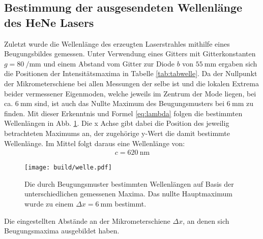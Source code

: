 \subsection{Bestimmung der ausgesendeten Wellenlänge des HeNe Lasers}
Zuletzt wurde die Wellenlänge des erzeugten Laserstrahles mithilfe eines Beugungsbildes gemessen. Unter Verwendung eines Gitters mit Gitterkonstanten $g = \SI{80}{\per\milli\meter}$ und einem Abstand vom Gitter zur Diode $b$ von $\SI{55}{\milli\meter}$ ergaben sich die Positionen der Intensitätsmaxima in Tabelle \ref{tab:tabwelle}. Da der Nullpunkt der Mikrometerschiene bei allen Messungen der selbe ist und die lokalen Extrema beider vermessener Eigenmoden, welche jeweils im Zentrum der Mode liegen, bei ca. $\SI{6}{\milli\meter}$ sind, ist auch das Nullte Maximum des Beugungsmusters bei $\SI{6}{\milli\meter}$ zu finden. Mit dieser Erkenntnis und Formel \eqref{eq:lambda} folgen die bestimmten Wellenlängen in Abb. \ref{fig:welle}. Die x Achse gibt dabei die Position des jeweilig betrachteten Maximums an, der zugehörige y-Wert die damit bestimmte Wellenlänge. Im Mittel folgt daraus eine Wellenlänge von: 
\begin{gather*}
	c = \SI{620}{\nano\meter}
	\end{gather*}







	



\begin{figure}
	\centering
	\texttt{[image: build/welle.pdf]}
	\caption{Die durch Beugungsmuster bestimmten Wellenlängen auf Basis der unterschiedlichen gemessenen Maxima. Das nullte Hauptmaximum wurde zu einem $\Delta x = \SI{6}{\milli\meter}$ bestimmt.}
	\label{fig:welle}
\end{figure}


\begin{table}
	\centering
	\caption{Die eingestellten Abstände an der Mikrometerschiene $\varDelta x$, an denen sich Beugungsmaxima ausgebildet haben.}
	
	\label{tab:tabwelle}
\end{table}
